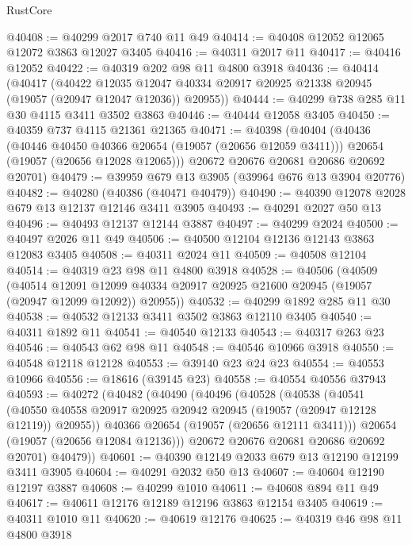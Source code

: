 \begin{lexlean}{RustCore}
\begin{coremodule}
@40408 := @40299 @2017 @740 @11 @49
@40414 := @40408 @12052 @12065 @12072 @3863 @12027 @3405
@40416 := @40311 @2017 @11
@40417 := @40416 @12052
@40422 := @40319 @202 @98 @11 @4800 @3918
@40436 := @40414
    (@40417
      (@40422
        @12035
        @12047
        @40334
        @20917
        @20925
        @21338
        @20945
        (@19057 (@20947 @12047 @12036))
        @20955))
@40444 := @40299 @738 @285 @11 @30 @4115 @3411 @3502 @3863
@40446 := @40444 @12058 @3405
@40450 := @40359 @737 @4115 @21361 @21365
@40471 := @40398
    (@40404
      (@40436
        (@40446 @40450 @40366 @20654 (@19057 (@20656 @12059 @3411)))
        @20654
        (@19057 (@20656 @12028 @12065)))
      @20672
      @20676
      @20681
      @20686
      @20692
      @20701)
@40479 := @39959 @679 @13 @3905 (@39964 @676 @13 @3904 @20776)
@40482 := @40280 (@40386 (@40471 @40479))
@40490 := @40390 @12078 @2028 @679 @13 @12137 @12146 @3411 @3905
@40493 := @40291 @2027 @50 @13
@40496 := @40493 @12137 @12144 @3887
@40497 := @40299 @2024
@40500 := @40497 @2026 @11 @49
@40506 := @40500 @12104 @12136 @12143 @3863 @12083 @3405
@40508 := @40311 @2024 @11
@40509 := @40508 @12104
@40514 := @40319 @23 @98 @11 @4800 @3918
@40528 := @40506
    (@40509
      (@40514
        @12091
        @12099
        @40334
        @20917
        @20925
        @21600
        @20945
        (@19057 (@20947 @12099 @12092))
        @20955))
@40532 := @40299 @1892 @285 @11 @30
@40538 := @40532 @12133 @3411 @3502 @3863 @12110 @3405
@40540 := @40311 @1892 @11
@40541 := @40540 @12133
@40543 := @40317 @263 @23
@40546 := @40543 @62 @98 @11
@40548 := @40546 @10966 @3918
@40550 := @40548 @12118 @12128
@40553 := @39140 @23 @24 @23
@40554 := @40553 @10966
@40556 := @18616 (@39145 @23)
@40558 := @40554 @40556 @37943
@40593 := @40272
    (@40482
      (@40490
        (@40496
          (@40528
            (@40538
              (@40541
                (@40550 @40558 @20917 @20925 @20942 @20945 (@19057 (@20947 @12128 @12119)) @20955))
              @40366
              @20654
              (@19057 (@20656 @12111 @3411)))
            @20654
            (@19057 (@20656 @12084 @12136)))
          @20672
          @20676
          @20681
          @20686
          @20692
          @20701)
        @40479))
@40601 := @40390 @12149 @2033 @679 @13 @12190 @12199 @3411 @3905
@40604 := @40291 @2032 @50 @13
@40607 := @40604 @12190 @12197 @3887
@40608 := @40299 @1010
@40611 := @40608 @894 @11 @49
@40617 := @40611 @12176 @12189 @12196 @3863 @12154 @3405
@40619 := @40311 @1010 @11
@40620 := @40619 @12176
@40625 := @40319 @46 @98 @11 @4800 @3918

\end{coremodule}
\end{lexlean}
